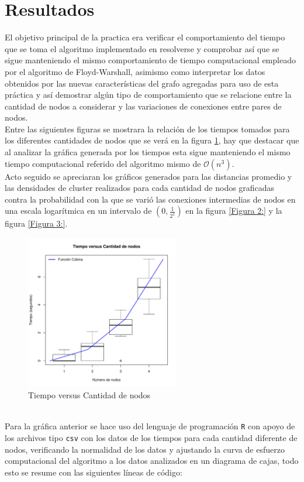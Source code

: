 \documentclass[12pt]{article}
\begin{document}
\section{Resultados}
El objetivo principal de la practica era verificar el comportamiento del tiempo que se toma el algoritmo implementado en resolverse y comprobar así que se sigue manteniendo el mismo comportamiento de tiempo computacional empleado por el algoritmo de Floyd-Warshall, asimismo como interpretar los datos obtenidos por las nuevas características del grafo agregadas para uso de esta práctica y así demostrar algún tipo de comportamiento que se relacione entre la cantidad de nodos a considerar y las variaciones de conexiones entre pares de nodos.\\
Entre las siguientes figuras se mostrara la relación de los tiempos tomados para los diferentes cantidades de nodos que se verá en la figura \ref{Figura 1:}, hay que destacar que al analizar la gráfica generada por los tiempos esta sigue manteniendo el mismo tiempo computacional referido del algoritmo mismo de $\mathcal{O}$$(n^3)$.
\\Acto seguido se apreciaran los gráficos generados para las distancias promedio y las densidades de cluster realizados para cada cantidad de nodos graficadas contra la probabilidad con la que se varió las conexiones intermedias de nodos en una escala logarítmica en un intervalo de $(0,\frac{1}{2^1})$ en la figura \ref{Figura 2:} y la figura \ref{Figura 3:}.\\
\begin{figure}[h!]
	\centering
	\includegraphics[width=0.6\textwidth]{TiempovsN}
	\caption{Tiempo versus Cantidad de nodos\label{Figura 1:}}
\end{figure}\pagebreak
\\Para la gráfica anterior se hace uso del lenguaje de programación \texttt{R}\cite{R} con apoyo de los archivos tipo \texttt{csv} con los datos de los tiempos para cada cantidad diferente de nodos, verificando la normalidad de los datos y ajustando la curva de esfuerzo computacional del algoritmo a los datos analizados en un diagrama de cajas, todo esto se resume con las siguientes líneas de código:
$$
\end{document}
